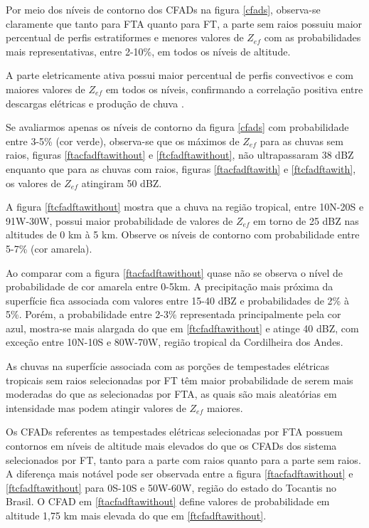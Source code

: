\documentclass[preprint,authoryear,3p]{elsarticle}
\begin{document}
\begin{multicols}{2}
Por meio dos níveis de contorno dos CFADs na figura \ref{cfads}, observa-se claramente que tanto para FTA quanto para FT, a parte sem raios possuiu maior percentual de perfis estratiformes e menores valores de $Z_{ef}$ com as  probabilidades mais representativas, entre 2-10\%, em todos os níveis de altitude.

A parte eletricamente ativa possui maior percentual de perfis convectivos e com maiores valores de $Z_{ef}$ em todos os níveis, confirmando a correlação positiva entre descargas elétricas e produção de chuva \citep{Petersen1998}.

Se avaliarmos apenas os níveis de contorno da figura \ref{cfads} com probabilidade entre 3-5\% (cor verde), observa-se que os máximos de $Z_{ef}$ para as chuvas sem raios, figuras \ref{ftacfadftawithout} e \ref{ftcfadftawithout}, não ultrapassaram 38 dBZ enquanto que para as chuvas com raios, figuras \ref{ftacfadftawith} e \ref{ftcfadftawith}, os valores de $Z_{ef}$ atingiram 50 dBZ.

A figura \ref{ftcfadftawithout} mostra que a chuva na região tropical, entre 10N-20S e 91W-30W, possui maior probabilidade de valores de $Z_{ef}$ em torno de 25 dBZ nas altitudes de  0 km à 5 km. Observe os níveis de contorno com probabilidade entre 5-7\% (cor amarela).

Ao comparar com a figura \ref{ftacfadftawithout} quase não se observa o nível de probabilidade de cor amarela entre 0-5km. A precipitação mais próxima da superfície fica associada com valores entre 15-40 dBZ e probabilidades de 2\% à 5\%. Porém, a probabilidade entre 2-3\% representada principalmente pela cor azul, mostra-se mais alargada do que em \ref{ftcfadftawithout} e atinge 40 dBZ, com exceção entre 10N-10S e 80W-70W, região tropical da Cordilheira dos Andes.

As chuvas na superfície associada com as porções de tempestades elétricas tropicais sem raios selecionadas por FT têm maior probabilidade de serem mais moderadas do que as selecionadas por FTA, as quais são mais aleatórias em intensidade mas podem atingir valores de $Z_{ef}$ maiores.

Os CFADs referentes as tempestades elétricas selecionadas por FTA possuem contornos em níveis de altitude mais elevados do que os CFADs dos sistema selecionados por FT, tanto para a parte com raios quanto para a parte sem raios. A diferença mais notável pode ser observada entre a figura \ref{ftacfadftawithout} e \ref{ftcfadftawithout} para 0S-10S e 50W-60W, região do estado do Tocantis no Brasil. O CFAD em \ref{ftacfadftawithout} define valores de probabilidade em altitude 1,75 km mais elevada do que em \ref{ftcfadftawithout}.



\end{multicols}
\end{document}
